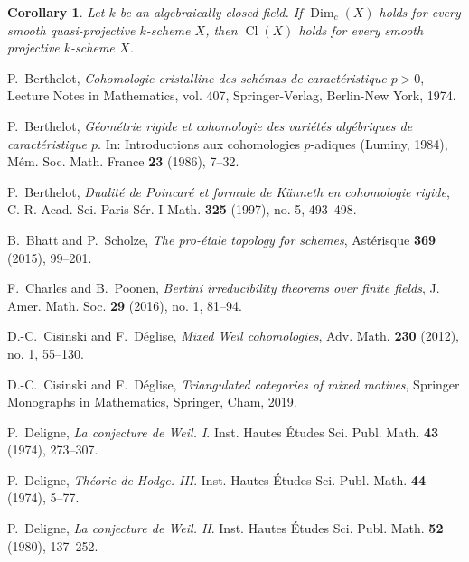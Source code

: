 \documentclass[11pt]{amsart}
\newtheorem{Cor}[Thm]{Corollary}
\theoremstyle{definition}
\newcommand{\Dim}{\operatorname{Dim}}
\newcommand{\Cl}{\operatorname{Cl}}
\begin{document}
\begin{Cor}
Let $k$ be an algebraically closed field. If $\Dim_c(X)$ holds for
every smooth quasi-projective $k$-scheme $X$, then $\Cl(X)$ holds
for every smooth projective $k$-scheme $X$. \hfill \qedsymbol
\end{Cor}





\begin{thebibliography}{10000000}


P.~Berthelot, \emph{Cohomologie cristalline des sch\'emas de
caract\'eristique {$p>0$}}, Lecture Notes in Mathematics, vol. 407,
Springer-Verlag,
  Berlin-New York, 1974.

P.~Berthelot, \emph{G\'eom\'etrie rigide et cohomologie des
vari\'et\'es alg\'ebriques de caract\'eristique {$p$}}. In: Introductions aux cohomologies $p$-adiques (Luminy, 1984), M\'em. Soc.
Math. France \textbf{23} (1986), 7--32.

P.~Berthelot, \emph{Dualit\'{e} de
  {P}oincar\'{e} et formule de {K}\"{u}nneth en cohomologie rigide},
C. R. Acad. Sci. Paris S\'{e}r. I Math. {\bf 325} (1997), no. 5,
493--498.

B.~Bhatt and P.~Scholze, \emph{The pro-\'etale topology
  for schemes}, Ast\'erisque {\bf 369} (2015), 99--201.

F.~Charles and B.~Poonen, \emph{Bertini irreducibility theorems over
finite fields}, J. Amer. Math. Soc. {\bf 29} (2016), no. 1, 81--94.

D.-C.~Cisinski and F.~D\'{e}glise, \emph{Mixed {W}eil cohomologies},
Adv. Math. {\bf 230} (2012), no. 1, 55--130.

D.-C.~Cisinski and F.~D\'{e}glise, \emph{Triangulated categories
  of mixed motives},
Springer Monographs in Mathematics, Springer, Cham, 2019.

P.~Deligne, \emph{La conjecture de
  {W}eil. {I}}.
Inst. Hautes \'Etudes Sci. Publ. Math. {\bf 43} (1974), 273--307.

P.~Deligne, \emph{Th\'eorie de
  {H}odge. {III}}.
Inst. Hautes \'Etudes Sci. Publ. Math. {\bf 44} (1974), 5--77.

P.~Deligne, \emph{La conjecture de {W}eil. {II}}. Inst. Hautes
\'Etudes Sci. Publ. Math. {\bf 52} (1980), 137--252.


\end{thebibliography}
\end{document}
